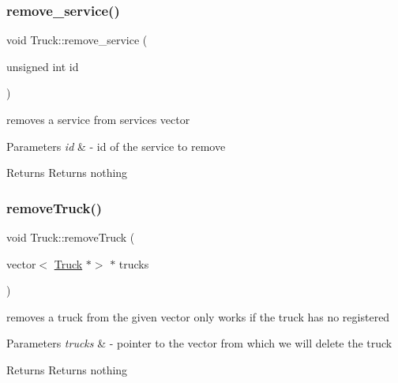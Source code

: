 \subsubsection{\texorpdfstring{remove\+\_\+service()}{remove\_service()}}
{\footnotesize\ttfamily void Truck\+::remove\+\_\+service (\begin{DoxyParamCaption}\item[{unsigned int}]{id }\end{DoxyParamCaption})}



removes a service from services vector 


\begin{DoxyParams}{Parameters}
{\em id} & -\/ id of the service to remove \\
\hline
\end{DoxyParams}
\begin{DoxyReturn}{Returns}
Returns nothing 
\end{DoxyReturn}
\mbox{\label{class_truck_acb3e375dfa4ba812de7e65f0b3e37ded}} 
\subsubsection{\texorpdfstring{remove\+Truck()}{removeTruck()}}
{\footnotesize\ttfamily void Truck\+::remove\+Truck (\begin{DoxyParamCaption}\item[{vector$<$ \hyperlink{class_truck}{Truck} $\ast$$>$ $\ast$}]{trucks }\end{DoxyParamCaption})\hspace{0.3cm}{\ttfamily [static]}}



removes a truck from the given vector only works if the truck has no registered 


\begin{DoxyParams}{Parameters}
{\em trucks} & -\/ pointer to the vector from which we will delete the truck \\
\hline
\end{DoxyParams}
\begin{DoxyReturn}{Returns}
Returns nothing 
\end{DoxyReturn}
\mbox{\label{class_truck_ad03e7d588f7f6dc24e1423e2e481ad3a}} 
